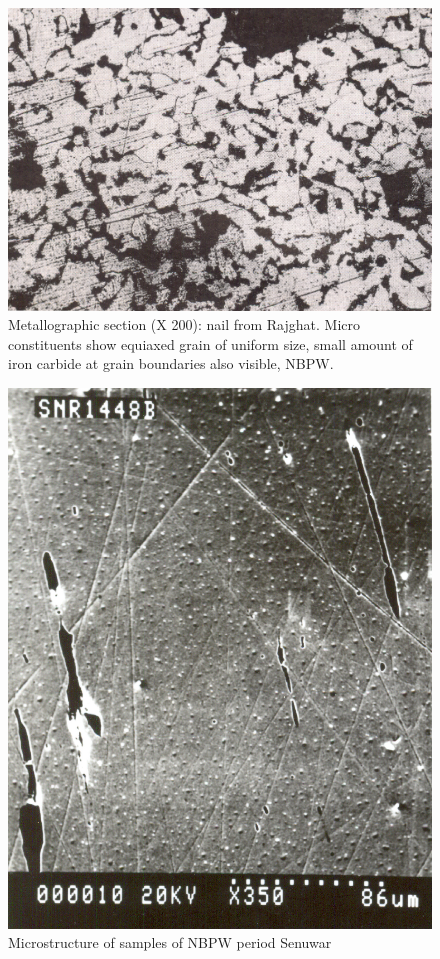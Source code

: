 
\begin{figure}[H]
\renewcommand{\thefigure}{24C}
\includegraphics[scale=0.6]{images/chapter-4/fig024C.jpg}
\caption{Metallographic section (X 200): nail from Rajghat. Micro constituents show equiaxed grain of uniform size, small amount of iron carbide at grain boundaries also visible, NBPW.}\label{chapter-4-fig24C}
\end{figure}

\newpage

\begin{figure}[H]
\renewcommand{\thefigure}{25A}
\includegraphics[scale=0.65]{images/chapter-4/fig025A.jpg}
\caption{Microstructure of samples of NBPW period Senuwar}\label{chapter-4-fig25A}
\end{figure}


